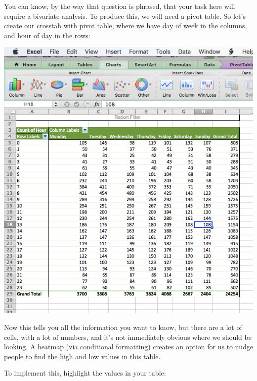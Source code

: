 \documentclass[]{book}
\theoremstyle{definition}
\theoremstyle{definition}
\theoremstyle{definition}
\theoremstyle{remark}
\begin{document}
You can know, by the way that question is phrased, that your task here
will require a bivariate analysis. To produce this, we will need a pivot
table. So let's create our crosstab with pivot table, where we have day
of week in the columns, and hour of day in the rows:

\includegraphics{imgs/hm_pivot.png}

Now this tells you all the information you want to know, but there are a
lot of cells, with a lot of numbers, and it's not immediately obvious
where we should be looking. A heatmap (via conditional formatting)
creates an option for us to nudge people to find the high and low values
in this table.

To implement this, highlight the values in your table:
\end{document}
